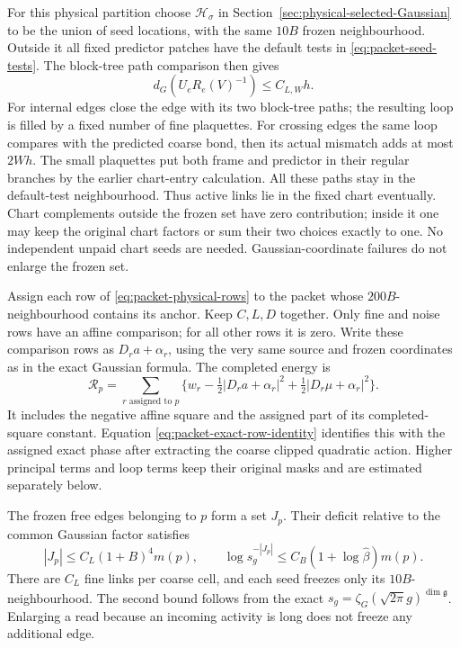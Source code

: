 \documentclass[11pt,reqno]{amsart}
\numberwithin{equation}{section}
\theoremstyle{definition}
\theoremstyle{remark}
\newcommand{\g}{\mathfrak g}
\begin{document}
For this physical partition choose \(\mathcal H_\sigma\) in
Section~\ref{sec:physical-selected-Gaussian} to be the union of
seed locations, with the same \(10B\) frozen neighbourhood.
Outside it all fixed predictor patches have the default tests
in \eqref{eq:packet-seed-tests}. The block-tree path comparison
then gives
\begin{equation}
 d_G(U_eR_e(V)^{-1})\le C_{L,W}h.
 \label{eq:packet-true-coordinate-entry}
\end{equation}
For internal edges close the edge with its two block-tree paths;
the resulting loop is filled by a fixed number of fine
plaquettes. For crossing edges the same loop compares with the
predicted coarse bond, then its actual mismatch adds at most
\(2Wh\). The small plaquettes put both frame and predictor in
their regular branches by the earlier chart-entry calculation.
All these paths stay in the default-test neighbourhood.
Thus active links lie in the fixed chart eventually.
Chart complements outside the frozen set have zero contribution;
inside it one may keep the original chart factors or sum their
two choices exactly to one. No independent unpaid chart seeds
are needed. Gaussian-coordinate failures do not enlarge the
frozen set.

Assign each row of \eqref{eq:packet-physical-rows} to the packet
whose \(200B\)-neighbourhood contains its anchor. Keep
\(C,L,D\) together. Only fine and noise rows have an affine
comparison; for all other rows it is zero. Write these
comparison rows as \(D_ra+\alpha_r\), using the very same
source and frozen coordinates as in the exact Gaussian formula.
The completed energy is
\begin{equation}
 \mathcal R_p=\sum_{r\text{ assigned to }p}
       \{w_r-\tfrac12|D_ra+\alpha_r|^2
                            +\tfrac12|D_r\mu+\alpha_r|^2\}.
 \label{eq:packet-completed-physical-energy}
\end{equation}
It includes the negative affine square and the assigned part
of its completed-square constant. Equation
\eqref{eq:packet-exact-row-identity} identifies this with the
assigned exact phase after extracting the coarse clipped
quadratic action. Higher principal terms and loop terms keep
their original masks and are estimated separately below.

The frozen free edges belonging to \(p\) form a set \(J_p\).
Their deficit relative to the common Gaussian factor satisfies
\begin{equation}
 |J_p|\le C_L(1+B)^4m(p),\qquad
 \log s_g^{-|J_p|}\le C_B(1+\log\widehat\beta)m(p).
 \label{eq:packet-frozen-bill}
\end{equation}
There are \(C_L\) fine links per coarse cell, and each seed
freezes only its \(10B\)-neighbourhood. The second bound follows
from the exact \(s_g=\zeta_G(\sqrt{2\pi}g)^{\dim\g}\).
Enlarging a read because an incoming activity is long does not
freeze any additional edge.
\end{document}
